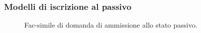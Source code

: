 \subsubsection{Modelli di iscrizione al passivo}


\begin{figure}[h!tbp]
\centering
{}
\caption{Fac-simile di domanda di ammissione allo stato passivo.}
\end{figure}

